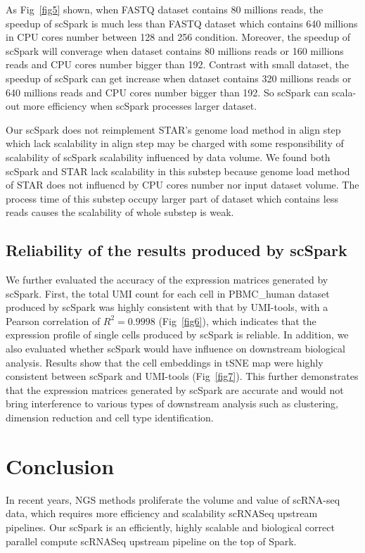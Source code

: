 \documentclass[conference]{IEEEtran}
\begin{document}
As Fig~\ref{fig5} shown, when FASTQ dataset contains 80 millions reads, the speedup of scSpark is much less than FASTQ dataset which contains 640 millions in CPU cores number between 128 and 256 condition.
Moreover, the speedup of scSpark will converage when dataset contains 80 millions reads or 160 millions reads and CPU cores number bigger than 192.
Contrast with small dataset, the speedup of scSpark can get increase when dataset contains 320 millions reads or 640 millions reads and CPU cores number bigger than 192.
So scSpark can scala-out more efficiency when scSpark processes larger dataset.

Our scSpark does not reimplement STAR's genome load method in align step which lack scalability in align step may be charged with some responsibility of scalability of scSpark scalability influenced by data volume.
We found both scSpark and STAR lack scalability in this substep because genome load method of STAR does not influencd by CPU cores number nor input dataset volume.
The process time of this substep occupy larger part of dataset which contains less reads causes the scalability of whole substep is weak. 

\subsection{Reliability of the results produced by scSpark} 
We further evaluated the accuracy of the expression matrices generated by scSpark.
First, the total UMI count for each cell in PBMC\_human dataset produced by scSpark was highly consistent with that by UMI-tools, with a Pearson correlation of $R^{2} = 0.9998$ (Fig~\ref{fig6}), which indicates that the expression profile of single cells produced by scSpark is reliable.
In addition, we also evaluated whether scSpark would have influence on downstream biological analysis.
Results show that the cell embeddings in tSNE map were highly consistent between scSpark and UMI-tools (Fig~\ref{fig7}).
This further demonstrates that the expression matrices generated by scSpark are accurate and would not bring interference to various types of downstream analysis such as clustering, dimension reduction and cell type identification.

\section{Conclusion}

In recent years, NGS methods proliferate the volume and value of scRNA-seq data, which requires more efficiency and scalability scRNASeq upstream pipelines.
Our scSpark is an efficiently, highly scalable and biological correct parallel compute scRNASeq upstream pipeline on the top of Spark.
\end{document}
